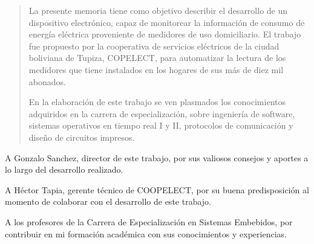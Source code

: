 \documentclass[
11pt, %
spanish,
singlespacing, %
parskip, %
headsepline, %
]{MastersDoctoralThesis} %
\begin{document}

\begin{abstract}
\addchaptertocentry{\abstractname} %
%
\centering

La presente memoria tiene como objetivo describir el desarrollo de un dispositivo electrónico, capaz de monitorear la información de consumo de energía eléctrica proveniente de medidores de uso domiciliario. El trabajo fue propuesto por la cooperativa de servicios eléctricos de la ciudad boliviana de Tupiza, COPELECT, para automatizar la lectura de los medidores que tiene instalados en los hogares de sus más de diez mil abonados.

En la elaboración de este trabajo se ven plasmados los conocimientos adquiridos en la carrera de especialización, sobre ingeniería de software, sistemas operativos en tiempo real I y II, protocolos de comunicación y diseño de circuitos impresos.

\end{abstract}


\begin{acknowledgements}
\vspace{1.5cm}


A Gonzalo Sanchez, director de este trabajo, por sus valiosos consejos y aportes a lo largo del desarrollo realizado.

A Héctor Tapia, gerente técnico de COOPELECT, por su buena predisposición al momento de colaborar con el desarrollo de este trabajo.

A los profesores de la Carrera de Especialización en Sistemas Embebidos, por contribuir en mi formación académica con sus conocimientos y experiencias.

\end{acknowledgements}
\end{document}
